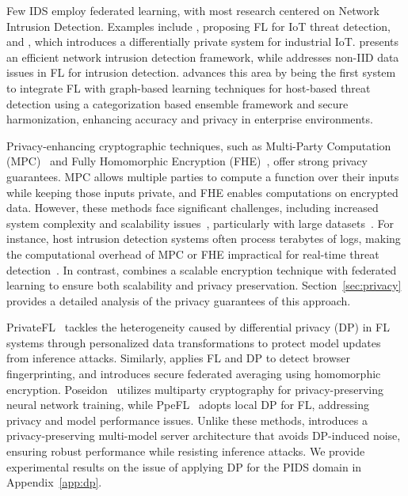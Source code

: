  Few IDS employ federated learning, with most research centered on Network Intrusion Detection. Examples include \cite{man2021intelligent}, proposing FL for IoT threat detection, and \cite{friha20232df}, which introduces a differentially private system for industrial IoT. \cite{li2023efficient} presents an efficient network intrusion detection framework, while \cite{guo2023new} addresses non-IID data issues in FL for intrusion detection. \Sys advances this area by being the first system to integrate FL with graph-based learning techniques for host-based threat detection using a categorization based \gnnshort ensemble framework and secure \wordvec harmonization, enhancing accuracy and privacy in enterprise environments.

 Privacy-enhancing cryptographic techniques, such as Multi-Party Computation (MPC)~\cite{cramer2015secure} and Fully Homomorphic Encryption (FHE)~\cite{armknecht2015guide}, offer strong privacy guarantees. MPC allows multiple parties to compute a function over their inputs while keeping those inputs private, and FHE enables computations on encrypted data. However, these methods face significant challenges, including increased system complexity and scalability issues~\cite{du2001secure, gentry2009fully, asharov2013more}, particularly with large datasets~\cite{menezes2018handbook}. For instance, host intrusion detection systems often process terabytes of logs, making the computational overhead of MPC or FHE impractical for real-time threat detection~\cite{loggc}. In contrast, \Sys combines a scalable encryption technique with federated learning to ensure both scalability and privacy preservation. Section~\ref{sec:privacy} provides a detailed analysis of the privacy guarantees of this approach.

 PrivateFL~\cite{yang2023privatefl} tackles the heterogeneity caused by differential privacy (DP) in FL systems through personalized data transformations to protect model updates from inference attacks. Similarly, \cite{annamalai2023fp} applies FL and DP to detect browser fingerprinting, and \cite{dasu2022prov} introduces secure federated averaging using homomorphic encryption. Poseidon~\cite{sav2020poseidon} utilizes multiparty cryptography for privacy-preserving neural network training, while PpeFL~\cite{wang2023ppefl} adopts local DP for FL, addressing privacy and model performance issues. Unlike these methods, \Sys introduces a privacy-preserving multi-model server architecture that avoids DP-induced noise, ensuring robust performance while resisting inference attacks. We provide experimental results on the issue of applying DP for the PIDS domain in Appendix~\ref{app:dp}.

